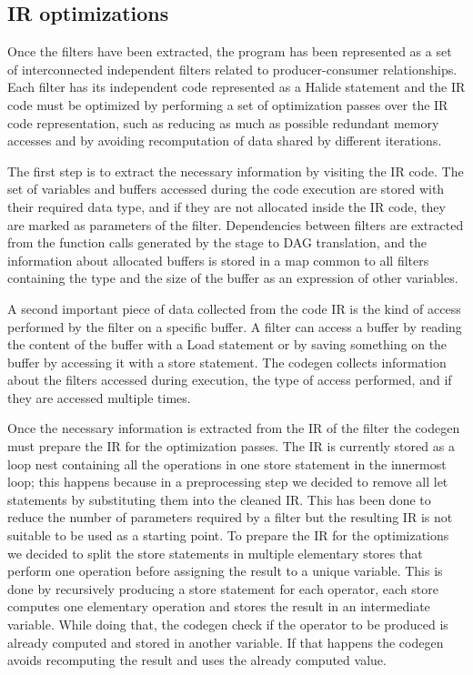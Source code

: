 \documentclass[../main.tex]{subfiles}
\begin{document}
\subsection{IR optimizations}

Once the filters have been extracted, the program has been represented as a set of interconnected independent filters related to producer-consumer relationships.
Each filter has its independent code represented as a Halide statement and the IR code must be optimized by performing a set of optimization passes over the IR code representation, such as reducing as much as possible redundant memory accesses and by avoiding recomputation of data shared by different iterations.

The first step is to extract the necessary information by visiting the IR code.
The set of variables and buffers accessed during the code execution are stored with their required data type, and if they are not allocated inside the IR code, they are marked as parameters of the filter.
Dependencies between filters are extracted from the function calls generated by the stage to DAG translation, and the information about allocated buffers is stored in a map common to all filters containing the type and the size of the buffer as an expression of other variables.

A second important piece of data collected from the code IR is the kind of access performed by the filter on a specific buffer.
A filter can access a buffer by reading the content of the buffer with a Load statement or by saving something on the buffer by accessing it with a store statement.
The codegen collects information about the filters accessed during execution, the type of access performed, and if they are accessed multiple times.

Once the necessary information is extracted from the IR of the filter the codegen must prepare the IR for the optimization passes.
The IR is currently stored as a loop nest containing all the operations in one store statement in the innermost loop; this happens because in a preprocessing step we decided to remove all let statements by substituting them into the cleaned IR.
This has been done to reduce the number of parameters required by a filter but the resulting IR is not suitable to be used as a starting point.
To prepare the IR for the optimizations we decided to split the store statements in multiple elementary stores that perform one operation before assigning the result to a unique variable.
This is done by recursively producing a store statement for each operator, each store computes one elementary operation and stores the result in an intermediate variable.
While doing that, the codegen check if the operator to be produced is already computed and stored in another variable.
If that happens the codegen avoids recomputing the result and uses the already computed value.
\end{document}
